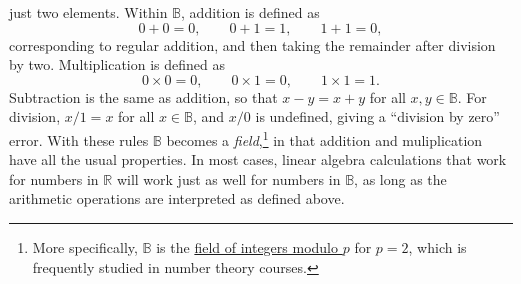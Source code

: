 \documentclass[11pt]{article}
\newcommand{\R}{\mathbb{R}}
\newcommand{\B}{\mathbb{B}}
\begin{document}
\begin{enumerate}
    just two elements. Within $\B$, addition is defined as
    \[
    0+0=0, \qquad 0+1 = 1, \qquad 1+1=0,
    \]
    corresponding to regular addition, and then taking the remainder after
    division by two. Multiplication is defined as
    \[
    0\times0=0, \qquad 0\times 1 = 0, \qquad 1\times 1= 1.
    \]
    Subtraction is the same as addition, so that $x-y=x+y$ for all $x,y\in \B$.
    For division, $x/1=x$ for all $x\in \B$, and $x/0$ is undefined, giving a
    ``division by zero'' error. With these rules $\B$ becomes a {\it
    field},\footnote{More specifically, $\B$ is the
    \href{http://en.wikipedia.org/wiki/Modular_arithmetic}{field of integers
    modulo $p$} for $p=2$, which is frequently studied in number theory
    courses.} in that addition and muliplication have all the usual properties.
    In most cases, linear algebra calculations that work for numbers in $\R$
    will work just as well for numbers in $\B$, as long as the arithmetic
    operations are interpreted as defined above.


\end{enumerate}
\end{document}
